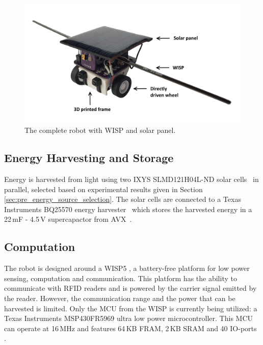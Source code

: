 \begin{figure}[h!]
	\centering
	\includegraphics[width=\textwidth]{pics/tp_robot2.png}
	\caption{The complete robot with WISP and solar panel.}
	\label{fig:robot_picture}
\end{figure}

\subsection{Energy Harvesting and Storage}
Energy is harvested from light using two IXYS SLMD121H04L-ND solar cells~\cite{ixolar_slmd121h04l_2017} in parallel, selected based on experimental results given in Section \ref{sec:pre_energy_source_selection}.
The solar cells are connected to a Texas Instruments BQ25570 energy harvester~\cite{bq25570_2017} which stores the harvested energy in a 22\,mF - 4.5\,V supercapactor from AVX~\cite{avx_bestcap_2017}.

\subsection{Computation}
\label{sec:dai_computation}

The robot is designed around a WISP5 \cite{wisp5_wiki_2017}, a battery-free platform for low power sensing, computation and communication.
This platform has the ability to communicate with RFID readers and is powered by the carrier signal emitted by the reader.
However, the communication range and the power that can be harvested is limited. 
Only the MCU from the WISP is currently being utilized: a Texas Instruments MSP430FR5969 ultra low power microcontroller.
This MCU can operate at 16\,MHz and features 64\,KB FRAM, 2\,KB SRAM and 40 IO-ports \cite{msp430fr5969_2017}.


